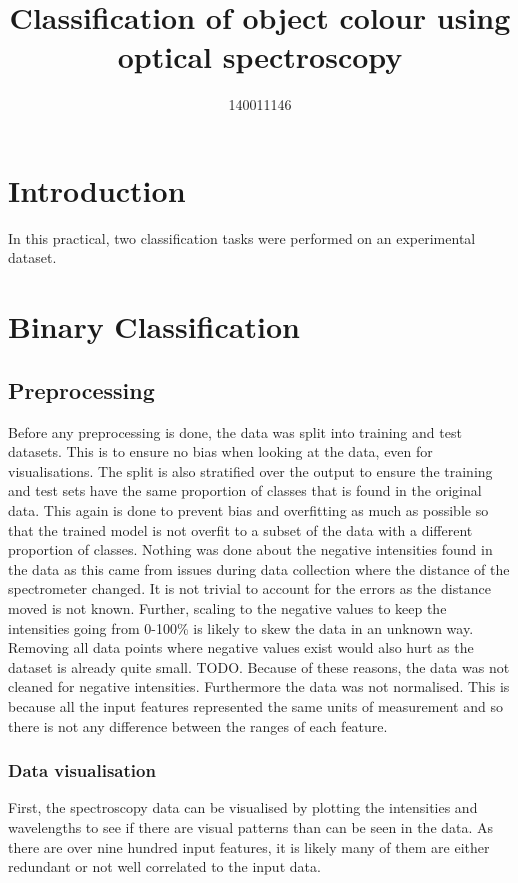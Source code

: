 \documentclass{article}
\title{Classification of object colour using optical spectroscopy}
\author{140011146}
\begin{document}



\section{Introduction}

In this practical, two classification tasks were performed on an experimental dataset. 

\section{Binary Classification}

\subsection{Preprocessing}
Before any preprocessing is done, the data was split into training and test datasets. This is to ensure no bias when looking at the data, even for visualisations. The split is also stratified over the output to ensure the training and test sets have the same proportion of classes that is found in the original data. This again is done to prevent bias and overfitting as much as possible so that the trained model is not overfit to a subset of the data with a different proportion of classes. 
\n
Nothing was done about the negative intensities found in the data as this came from issues during data collection where the distance of the spectrometer changed. It is not trivial to account for the errors as the distance moved is not known. Further, scaling to the negative values to keep the intensities going from 0-100\% is likely to skew the data in an unknown way. Removing all data points where negative values exist would also hurt as the dataset is already quite small. TODO. Because of these reasons, the data was not cleaned for negative intensities. Furthermore the data was not normalised. This is because all the input features represented the same units of measurement and so there is not any difference between the ranges of each feature. 


\subsubsection{Data visualisation}
First, the spectroscopy data can be visualised by plotting the intensities and wavelengths to see if there are visual patterns than can be seen in the data. As there are over nine hundred input features, it is likely many of them are either redundant or not well correlated to the input data. 
\end{document}
